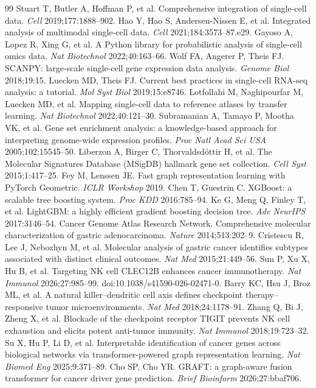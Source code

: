 \documentclass[modern,large,numbered,nocrop]{oup-authoring-template}
\begin{document}
\begin{thebibliography}{99}
 Stuart T, Butler A, Hoffman P, et al. Comprehensive integration of single-cell data. \textit{Cell} 2019;177:1888--902.
 Hao Y, Hao S, Andersen-Nissen E, et al. Integrated analysis of multimodal single-cell data. \textit{Cell} 2021;184:3573--87.e29.
 Gayoso A, Lopez R, Xing G, et al. A Python library for probabilistic analysis of single-cell omics data. \textit{Nat Biotechnol} 2022;40:163--66.
 Wolf FA, Angerer P, Theis FJ. SCANPY: large-scale single-cell gene expression data analysis. \textit{Genome Biol} 2018;19:15.
 Luecken MD, Theis FJ. Current best practices in single-cell RNA-seq analysis: a tutorial. \textit{Mol Syst Biol} 2019;15:e8746.
 Lotfollahi M, Naghipourfar M, Luecken MD, et al. Mapping single-cell data to reference atlases by transfer learning. \textit{Nat Biotechnol} 2022;40:121--30.
 Subramanian A, Tamayo P, Mootha VK, et al. Gene set enrichment analysis: a knowledge-based approach for interpreting genome-wide expression profiles. \textit{Proc Natl Acad Sci USA} 2005;102:15545--50.
 Liberzon A, Birger C, Thorvaldsd\'ottir H, et al. The Molecular Signatures Database (MSigDB) hallmark gene set collection. \textit{Cell Syst} 2015;1:417--25.
 Fey M, Lenssen JE. Fast graph representation learning with PyTorch Geometric. \textit{ICLR Workshop} 2019.
 Chen T, Guestrin C. XGBoost: a scalable tree boosting system. \textit{Proc KDD} 2016:785--94.
 Ke G, Meng Q, Finley T, et al. LightGBM: a highly efficient gradient boosting decision tree. \textit{Adv NeurIPS} 2017:3146--54.
 Cancer Genome Atlas Research Network. Comprehensive molecular characterization of gastric adenocarcinoma. \textit{Nature} 2014;513:202--9.
 Cristescu R, Lee J, Nebozhyn M, et al. Molecular analysis of gastric cancer identifies subtypes associated with distinct clinical outcomes. \textit{Nat Med} 2015;21:449--56.
 Sun P, Xu X, Hu B, et al. Targeting NK cell CLEC12B enhances cancer immunotherapy. \textit{Nat Immunol} 2026;27:985--99. doi:10.1038/s41590-026-02471-0.
 Barry KC, Hsu J, Broz ML, et al. A natural killer--dendritic cell axis defines checkpoint therapy--responsive tumor microenvironments. \textit{Nat Med} 2018;24:1178--91.
 Zhang Q, Bi J, Zheng X, et al. Blockade of the checkpoint receptor TIGIT prevents NK cell exhaustion and elicits potent anti-tumor immunity. \textit{Nat Immunol} 2018;19:723--32.
 Su X, Hu P, Li D, et al. Interpretable identification of cancer genes across biological networks via transformer-powered graph representation learning. \textit{Nat Biomed Eng} 2025;9:371--89.
 Cho SP, Cho YR. GRAFT: a graph-aware fusion transformer for cancer driver gene prediction. \textit{Brief Bioinform} 2026;27:bbaf706.
\end{thebibliography}
\end{document}
